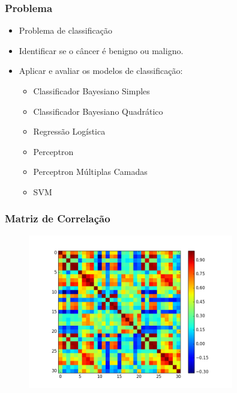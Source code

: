 \documentclass{beamer}
\begin{document}
\begin{frame}
\frametitle{Problema}
\begin{itemize}
\item Problema de classificação
\item Identificar se o câncer é benigno ou maligno.
\item Aplicar e avaliar os modelos de classificação:
\begin{itemize}
\item Classificador Bayesiano Simples
\item Classificador Bayesiano Quadrático
\item Regressão Logística
\item Perceptron
\item Perceptron Múltiplas Camadas
\item SVM
\end{itemize}
\end{itemize}
\end{frame}



\begin{frame}
\frametitle{Matriz de Correlação}
\begin{figure}[H]
    \centering
    \includegraphics[width=0.8\textwidth]{../img/corrcoef.png}
    \label{fig:corrcoef}
\end{figure}
\end{frame}

\end{document}
